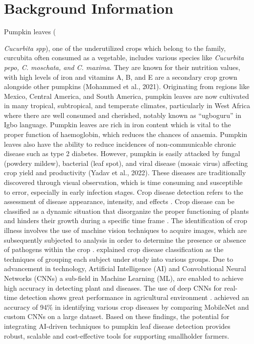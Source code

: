 \section{Background Information} 
\sectionTitleBody

Pumpkin leaves ({\textit{Cucurbita spp}), one of the underutilized
	crops which belong to the family, curcubita often consumed as a vegetable,
	includes various species like \textit{Cucurbita pepo, C. moschata, and C.
	maxima}. They are known for their nutrition values, with high levels
	of iron and vitamins A, B, and E are a secondary crop grown alongside other pumpkins
	(Mohammed et al., 2021). Originating from regions like Mexico, Central
	America, and South America, pumpkin leaves are now cultivated in many
	tropical, subtropical, and temperate climates, particularly in West
	Africa where there are well consumed and cherished, notably known as \textquotedblleft ugboguru\textquotedblright{}
	in Igbo language. Pumpkin leaves are rich in iron content which is vital to
	the proper function of haemoglobin, which reduces the chances of anaemia.
	Pumpkin leaves also have the ability to reduce incidences of non-communicable
	chronic disease such as type 2 diabetes. However, pumpkin is easily
	attacked by fungal (powdery mildew), bacterial (leaf spot), and viral
	disease (mosaic virus) affecting crop yield and productivity (Yadav
	et al., 2022). These diseases are traditionally discovered through visual
	observation, which is time consuming and susceptible to error, especially
	in early infection stages. Crop disease detection refers to the assessment
	of disease appearance, intensity, and effects \citep{abduMachineLearningPlant2020}.
	Crop disease can be classified as a dynamic situation that disorganize
	the proper functioning of plants and hinders their growth during a
	specific time frame \citep{abduMachineLearningPlant2020}. The identification of crop
	illness involves the use of machine vision techniques to acquire images,
	which are subsequently subjected to analysis in order to determine
	the presence or absence of pathogens within the crop \citep{liuPlantDiseasesPests2021a}. \cite{barureDiseaseDetectionPlant2020a} explained crop disease classification as
	the techniques of grouping each subject under study into various groups.
	Due to advancement in technology, Artificial Intelligence (AI) and
	Convolutional Neural Networks (CNNs) a sub-field in Machine Learning (ML), are enabled to achieve
	high accuracy in detecting plant and diseases. The use of deep CNNs
	for real-time detection shows great performance in agricultural environment
	\citep{khalidRealTimePlantHealth2023a}. \cite{nwanetoHarnessingDeepLearning2024a} achieved an accuracy
	of 94\% in identifying various crop diseases by comparing MobileNet
	and custom CNNs on a large dataset. Based on these findings, the potential
	for integrating AI-driven techniques to pumpkin leaf disease detection
	provides robust, scalable and cost-effective tools for supporting
	smallholder farmers.

}
